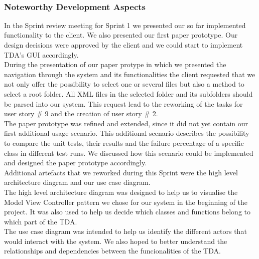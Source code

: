 \ \\ 

\subsubsection*{Noteworthy Development Aspects}

In the Sprint review meeting for Sprint 1 we presented our so far implemented functionality to the client. We also presented our first paper prototype. Our design decisions were approved by the client and we could start to implement TDA's GUI accordingly. \\ 

During the presentation of our paper protype in which we presented the navigation through the system and its functionalities the client requested that we not only offer the possibility to select one or several files but also a method to select a root folder. All XML files in the selected folder and its subfolders should be parsed into our system. This request lead to the reworking of the tasks for user story \# 9 and the creation of user story \# 2. \\ 

The paper prototype was refined and extended, since it did not yet contain our first additional usage scenario. This additional scenario describes the possibility to compare the unit tests, their results and the failure percentage of a specific class in different test runs. We discussed how this scenario could be implemented and designed the paper prototype accordingly. \\ 

Additional artefacts that we reworked during this Sprint were the high level architecture diagram and our use case diagram. \\ 
The high level architecture diagram was designed to help us to visualise the Model View Controller pattern we chose for our system in the beginning of the project. It was also used to help us decide which classes and functions belong to which part of the TDA. \\ 
The use case diagram was intended to help us identify the different actors that would interact with the system. We also hoped to better understand the relationships and dependencies between the funcionalities of the TDA. \\ 

